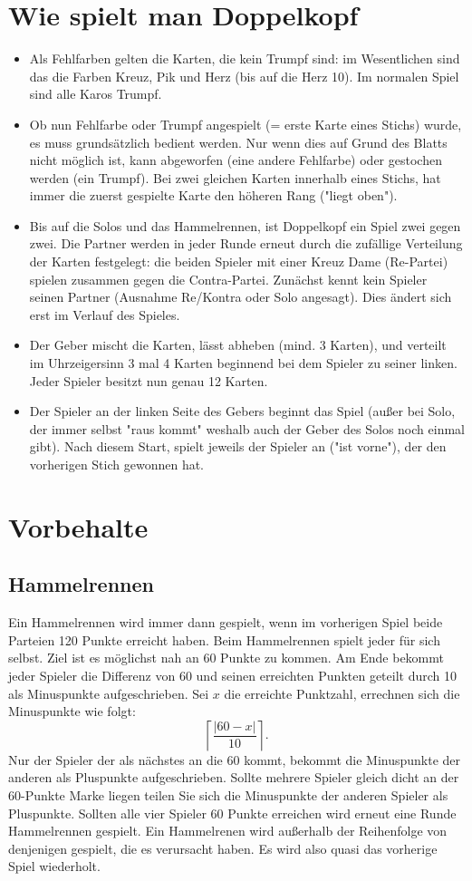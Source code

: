 \documentclass[a4paper,11pt]{article}
\begin{document}
\section{Wie spielt man Doppelkopf}
\begin{itemize}
\item Als Fehlfarben gelten die Karten, die kein Trumpf sind: im Wesentlichen sind das die Farben Kreuz, Pik und Herz (bis auf die Herz 10). Im normalen Spiel sind alle Karos Trumpf.
\item Ob nun Fehlfarbe oder Trumpf angespielt (= erste Karte eines Stichs) wurde, es muss grundsätzlich bedient werden. Nur wenn dies auf Grund des Blatts nicht möglich ist, kann abgeworfen (eine andere Fehlfarbe) oder gestochen werden (ein Trumpf).
Bei zwei gleichen Karten innerhalb eines Stichs, hat immer die zuerst gespielte Karte den höheren Rang ("liegt oben").
\item Bis auf die Solos und das Hammelrennen, ist Doppelkopf ein Spiel zwei gegen zwei. Die Partner werden in jeder Runde erneut durch die zufällige Verteilung der Karten festgelegt:
die beiden Spieler mit einer Kreuz Dame (Re-Partei) spielen zusammen gegen die Contra-Partei. Zunächst kennt kein Spieler seinen Partner (Ausnahme Re/Kontra oder Solo angesagt). Dies ändert sich erst im Verlauf des Spieles.
\item Der Geber mischt die Karten, lässt abheben (mind. 3 Karten), und verteilt im Uhrzeigersinn 3 mal 4 Karten beginnend bei dem Spieler zu seiner linken. Jeder Spieler besitzt nun genau 12 Karten. 
\item Der Spieler an der linken Seite des Gebers beginnt das Spiel (außer bei Solo, der immer selbst "raus kommt" weshalb auch der Geber des Solos noch einmal gibt). Nach diesem Start, spielt jeweils der Spieler an ("ist vorne"), der den vorherigen Stich gewonnen hat.
\end{itemize}
\section{Vorbehalte}\label{Vorbehalte}
\subsection{Hammelrennen}\label{Hammelrennen}
Ein Hammelrennen wird immer dann gespielt, wenn im vorherigen Spiel beide Parteien 120 Punkte erreicht haben. Beim Hammelrennen spielt jeder für sich selbst. Ziel ist es möglichst nah an 60 Punkte zu kommen. Am Ende bekommt jeder Spieler die Differenz von 60 und seinen erreichten Punkten geteilt durch 10 als Minuspunkte aufgeschrieben. Sei $x$ die erreichte Punktzahl, errechnen sich die Minuspunkte wie folgt:
\[\left\lceil\frac{\lvert 60-x\lvert}{10} \right\rceil.\]
Nur der Spieler der als nächstes an die 60 kommt, bekommt die Minuspunkte der anderen als Pluspunkte aufgeschrieben. Sollte mehrere Spieler gleich dicht an der 60-Punkte Marke liegen teilen Sie sich die Minuspunkte der anderen Spieler als Pluspunkte. Sollten alle vier Spieler 60 Punkte erreichen wird erneut eine Runde Hammelrennen gespielt.
Ein Hammelrenen wird außerhalb der Reihenfolge von denjenigen gespielt, die es verursacht haben. Es wird also quasi das vorherige Spiel wiederholt.
\end{document}
